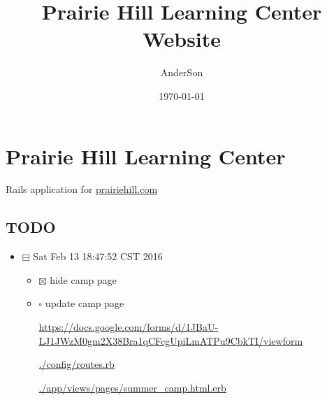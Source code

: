 \documentclass[11pt]{article}
\author{AnderSon}
\date{\today}
\title{Prairie Hill Learning Center Website}
\begin{document}
\maketitle

\section*{Prairie Hill Learning Center}
\label{sec-1}

Rails application for \href{http://www.prairiehill.com}{prairiehill.com}

\subsection*{{\bfseries\sffamily TODO} }
\label{sec-1-1}

\begin{itemize}
\item $\boxminus$ Sat Feb 13 18:47:52 CST 2016

\begin{itemize}
\item $\boxtimes$ hide camp page
\item $\square$ update camp page

\url{https://docs.google.com/forms/d/1JBaU-LJ1JWzM0gm2X38Bra1qCFcgUpiLmATPu9CbkTI/viewform}

\url{./config/routes.rb}

\url{./app/views/pages/summer_camp.html.erb}


\end{itemize}
\end{itemize}
\end{document}
